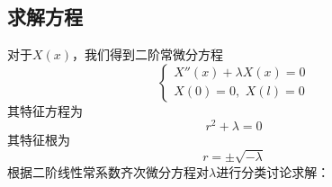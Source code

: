 \subsection{求解方程}
对于$X(x)$，我们得到二阶常微分方程
\begin{equation}
	\begin{cases}
		X''(x) + \lambda X(x) = 0\\
		X(0) = 0,\,\, X(l) = 0
	\end{cases}
\end{equation}
其特征方程为
\begin{equation}
	r^2 + \lambda = 0
\end{equation}
其特征根为
\begin{equation}
	r = \pm \sqrt{- \lambda}
\end{equation}
根据二阶线性常系数齐次微分方程对$\lambda$进行分类讨论求解：

